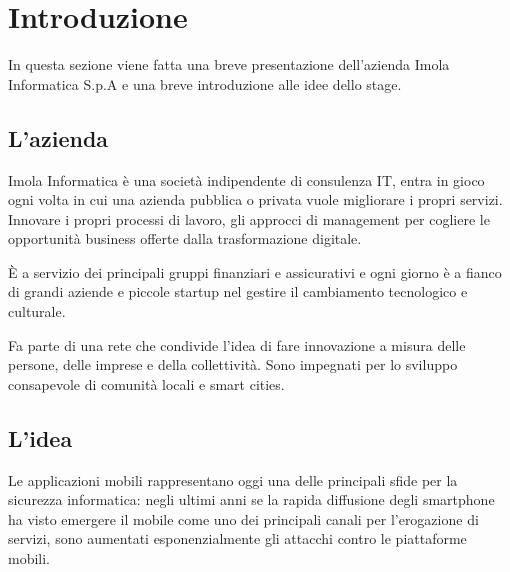 
\chapter{Introduzione}\label{ch:introduzione}

In questa sezione viene fatta una breve presentazione dell'azienda Imola Informatica S.p.A e una breve introduzione alle idee dello stage.
%
%

\section{L'azienda}\label{sec:l'azienda}

Imola Informatica è una società indipendente di consulenza IT, entra in gioco ogni volta in cui una azienda pubblica o privata vuole migliorare i propri servizi. Innovare i propri processi di lavoro, gli approcci di management per cogliere le opportunità business offerte dalla trasformazione digitale.

\`{E} a servizio dei principali gruppi finanziari e assicurativi e ogni giorno è a fianco di grandi aziende e piccole startup nel gestire il cambiamento tecnologico e culturale.

Fa parte di una rete che condivide l’idea di fare innovazione a misura delle persone, delle imprese e della collettività. Sono impegnati per lo sviluppo consapevole di comunità locali e smart cities.

\section{L'idea}\label{sec:l'idea}

Le applicazioni mobili rappresentano oggi una delle principali sfide per la sicurezza informatica: negli ultimi anni se la rapida diffusione degli smartphone ha visto emergere il mobile come uno dei principali canali per l'erogazione di servizi, sono aumentati esponenzialmente gli attacchi contro le piattaforme mobili.

